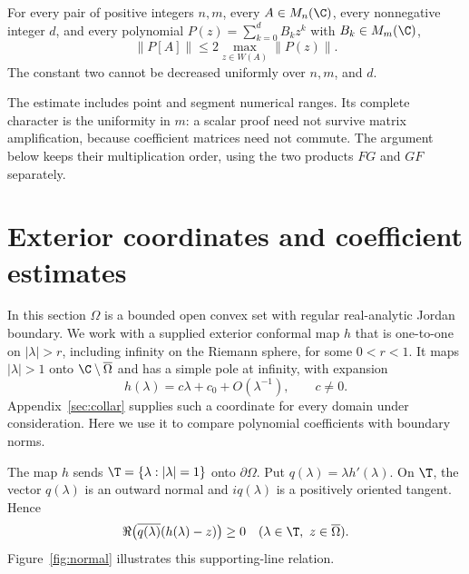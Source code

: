 
\begin{theorem}\label{thm:main}
For every pair of positive integers $n,m$, every $A\in M_n(\C)$,
every nonnegative integer $d$, and every polynomial
$P(z)=\sum_{k=0}^d B_kz^k$ with $B_k\in M_m(\C)$,
\begin{equation}\label{eq:main}
 \|P[A]\|\le2\max_{z\in W(A)}\|P(z)\|.
\end{equation}
The constant two cannot be decreased uniformly over $n,m$, and $d$.
\end{theorem}

The estimate includes point and segment numerical ranges. Its complete
character is the uniformity in $m$: a scalar proof need not survive
matrix amplification, because coefficient matrices need not commute.
The argument below keeps their multiplication order, using the two
products $FG$ and $GF$ separately.




\section{Exterior coordinates and coefficient estimates}\label{sec:coefficients}
In this section $\Omega$ is a bounded open convex set with regular real-analytic Jordan boundary. We work with a supplied exterior conformal map $h$ that is one-to-one on $|\lambda|>r$, including infinity on the Riemann sphere, for some $0<r<1$. It maps $|\lambda|>1$ onto $\C\setminus\overline\Omega$ and has a simple pole at infinity, with expansion
\begin{equation}\label{eq:h}
 h(\lambda)=c\lambda+c_0+O(\lambda^{-1}),\qquad c\ne0.
\end{equation}
Appendix~\ref{sec:collar} supplies such a coordinate for every domain under consideration. Here we use it to compare polynomial coefficients with boundary norms.

The map $h$ sends $\T=\{\lambda:|\lambda|=1\}$ onto $\partial\Omega$. Put $q(\lambda)=\lambda h'(\lambda)$. On $\T$, the vector $q(\lambda)$ is an outward normal and $iq(\lambda)$ is a positively oriented tangent. Hence
\begin{equation}\label{eq:support}
 \Re\bigl(\overline{q(\lambda)}(h(\lambda)-z)\bigr)\ge0
 \quad(\lambda\in\T,\ z\in\overline\Omega).
\end{equation}
Figure~\ref{fig:normal} illustrates this supporting-line relation.

